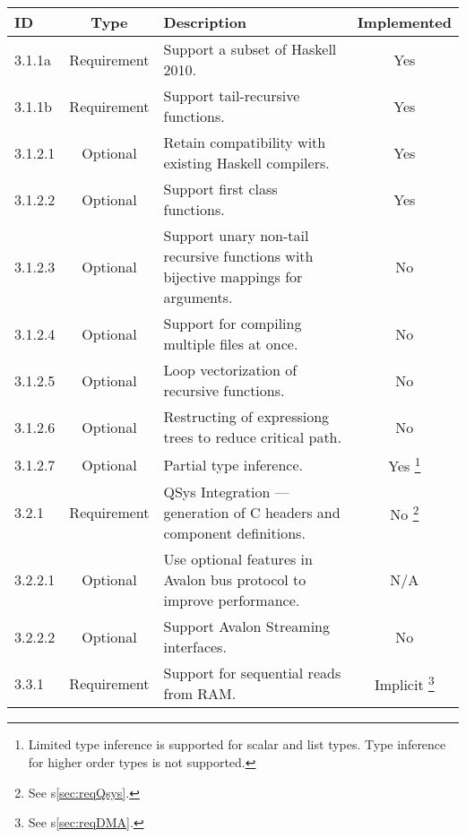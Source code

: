 \documentclass[english,onecolumn]{scrartcl}
\begin{document}
\begin{tabularx}{\textwidth}{l c X c}
\toprule
ID      & Type              & Description                 & Implemented
\\ \midrule

3.1.1a  & Requirement & Support a subset of Haskell 2010. & Yes
\\ \midrule

3.1.1b  & Requirement & Support tail-recursive functions. & Yes
\\ \midrule

3.1.2.1 & Optional    & Retain compatibility with existing Haskell compilers. & Yes
\\ \midrule

3.1.2.2 & Optional    & Support first class functions. & Yes
\\ \midrule

3.1.2.3 & Optional    & Support unary non-tail recursive functions with bijective mappings for arguments. & No
\\ \midrule

3.1.2.4 & Optional    & Support for compiling multiple files at once. & No
\\ \midrule

3.1.2.5 & Optional    & Loop vectorization of recursive functions. & No
\\ \midrule

3.1.2.6 & Optional    & Restructing of expressiong trees to reduce critical path. & No
\\ \midrule

3.1.2.7 & Optional    & Partial type inference. & Yes%
\footnote{Limited type inference is supported for scalar and list types. Type inference for higher order types is not supported.}
\\ \midrule

3.2.1   & Requirement & QSys Integration --- generation of C headers and component definitions. & No%
\footnote{See s\ref{sec:reqQsys}.}
\\ \midrule

3.2.2.1 & Optional    & Use optional features in Avalon bus protocol to improve performance. & N/A
\\ \midrule

3.2.2.2 & Optional    & Support Avalon Streaming interfaces. & No
\\ \midrule

3.3.1   & Requirement & Support for sequential reads from RAM. & Implicit%
\footnote{See s\ref{sec:reqDMA}.}
\\ \midrule


\end{tabularx}
\end{document}
